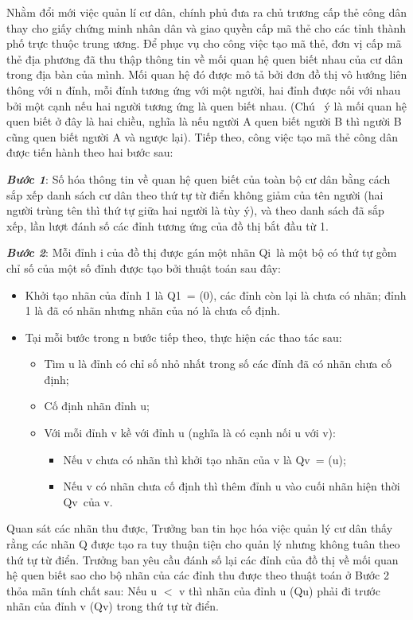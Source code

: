 

Nhằm đổi mới việc quản lí cư dân, chính phủ đưa ra chủ trương cấp thẻ công dân thay cho giấy chứng minh nhân dân và giao quyền cấp mã thẻ cho các tỉnh thành phố trực thuộc trung ương. Để phục vụ cho công việc tạo mã thẻ, đơn vị cấp mã thẻ địa phương đã thu thập thông tin về mối quan hệ quen biết nhau của cư dân trong địa bàn của mình. Mối quan hệ đó được mô tả bởi đơn đồ thị vô hướng liên thông với n đỉnh, mỗi đỉnh tương ứng với một người, hai đỉnh được nối với nhau bởi một cạnh nếu hai người tương ứng là quen biết nhau. (Chú  ý là mối quan hệ quen biết ở đây là hai chiều, nghĩa là nếu người A quen biết người B thì người B cũng quen biết người A và ngược lại). Tiếp theo, công việc tạo mã thẻ công dân được tiến hành theo hai bước sau:

\textbf{\emph{Bước 1}}: Số hóa thông tin về quan hệ quen biết của toàn bộ cư dân bằng cách sắp xếp danh sách cư dân theo thứ tự từ điển không giảm của tên người (hai người trùng tên thì thứ tự giữa hai người là tùy ý), và theo danh sách đã sắp xếp, lần lượt đánh số các đỉnh tương ứng của đồ thị bắt đầu từ 1.

\textbf{\emph{Bước 2}}: Mỗi đỉnh i của đồ thị được gán một nhãn Qi là một bộ có thứ tự gồm chỉ số của một số đỉnh được tạo bởi thuật toán sau đây:
\begin{itemize}
	\item Khởi tạo nhãn của đỉnh 1 là Q1 = (0), các đỉnh còn lại là chưa có nhãn; đỉnh 1 là đã có nhãn nhưng nhãn của nó là chưa cố định.
	\item Tại mỗi bước trong n bước tiếp theo, thực hiện các thao tác sau:
\begin{itemize}
	\item Tìm u là đỉnh có chỉ số nhỏ nhất trong số các đỉnh đã có nhãn chưa cố định;
	\item Cố định nhãn đỉnh u;
	\item Với mỗi đỉnh v kề với đỉnh u (nghĩa là có cạnh nối u với v):
\begin{itemize}
	\item Nếu v chưa có nhãn thì khởi tạo nhãn của v là Qv = (u);
	\item Nếu v có nhãn chưa cố định thì thêm đỉnh u vào cuối nhãn hiện thời Qv của v.
\end{itemize}
\end{itemize}
\end{itemize}

Quan sát các nhãn thu được, Trưởng ban tin học hóa việc quản lý cư dân thấy rằng các nhãn Q được tạo ra tuy thuận tiện cho quản lý nhưng không tuân theo thứ tự từ điển. Trưởng ban yêu cầu đánh số lại các đỉnh của đồ thị về mối quan hệ quen biết sao cho bộ nhãn của các đỉnh thu được theo thuật toán ở Bước 2 thỏa mãn tính chất sau: Nếu u $<$ v thì nhãn của đỉnh u (Qu) phải đi trước nhãn của đỉnh v (Qv) trong thứ tự từ điển.

